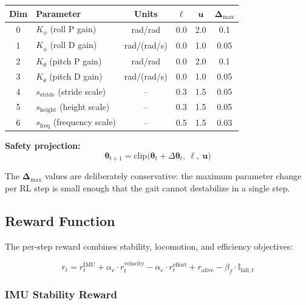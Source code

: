 \documentclass[11pt]{article}
\begin{document}
\begin{center}
\begin{tabular}{clcccc}
\toprule
\textbf{Dim} & \textbf{Parameter} & \textbf{Units} & \textbf{$\boldsymbol{\ell}$} & \textbf{$\mathbf{u}$} & \textbf{$\boldsymbol{\Delta}_{\max}$} \\
\midrule
0 & $K_\phi$ (roll P gain) & rad/rad & 0.0 & 2.0 & 0.1 \\
1 & $K_{\dot\phi}$ (roll D gain) & rad/(rad/s) & 0.0 & 1.0 & 0.05 \\
2 & $K_\theta$ (pitch P gain) & rad/rad & 0.0 & 2.0 & 0.1 \\
3 & $K_{\dot\theta}$ (pitch D gain) & rad/(rad/s) & 0.0 & 1.0 & 0.05 \\
4 & $s_{\mathrm{stride}}$ (stride scale) & -- & 0.3 & 1.5 & 0.05 \\
5 & $s_{\mathrm{height}}$ (height scale) & -- & 0.3 & 1.5 & 0.05 \\
6 & $s_{\mathrm{freq}}$ (frequency scale) & -- & 0.5 & 1.5 & 0.03 \\
\bottomrule
\end{tabular}
\end{center}

\textbf{Safety projection:}
\begin{equation}
\boldsymbol{\theta}_{t+1} = \mathrm{clip}\!\bigl(\boldsymbol{\theta}_t + \Delta\boldsymbol{\theta}_t,\ \boldsymbol{\ell},\ \mathbf{u}\bigr)
\label{eq:projection}
\end{equation}

The $\boldsymbol{\Delta}_{\max}$ values are deliberately conservative: the maximum parameter change per RL step is small enough that the gait cannot destabilize in a single step.

\subsection{Reward Function}
\label{sec:reward}

The per-step reward combines stability, locomotion, and efficiency objectives:

\begin{equation}
r_t = r_t^{\mathrm{IMU}} + \alpha_v \cdot r_t^{\mathrm{velocity}} - \alpha_e \cdot r_t^{\mathrm{effort}} + r_{\mathrm{alive}} - \beta_f \cdot \mathbb{I}_{\mathrm{fall},t}
\label{eq:reward}
\end{equation}

\subsubsection{IMU Stability Reward}
\end{document}
